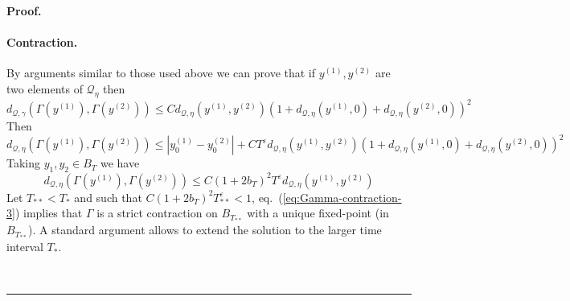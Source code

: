 \documentclass[a4paper,11pt,reqno]{article}
\newcommand{\eps}{\varepsilon}
\newcommand{\QQ}{\mathcal{Q}}
\newenvironment{proof}[1][Proof]{\textbf{#1.} }{\ \rule{0.5em}{0.5em}}
\begin{document}
\begin{proof}
\paragraph{Contraction.}
By arguments similar to those used above we can prove that if $y^{(1)},
y^{(2)}$ are two elements of $\QQ_{\eta}$ then
\begin{equation}
  \label{eq:Gamma-contraction}
  d_{\QQ,\gamma}(\Gamma(y^{(1)}),\Gamma(y^{(2)})) \le C d_{\QQ,\eta}(y^{(1)},y^{(2)}) (1+d_{\QQ,\eta}(y^{(1)},0)+d_{\QQ,\eta}(y^{(2)},0))^2 
\end{equation}
Then 
\begin{equation}
  \label{eq:Gamma-contraction-2}
   d_{\QQ,\eta}(\Gamma(y^{(1)}),\Gamma(y^{(2)})) \le
  |y^{(1)}_0-y^{(2)}_0| 
  + C T^\eps  d_{\QQ,\eta}(y^{(1)},y^{(2)}) (1+ d_{\QQ,\eta}(y^{(1)},0)+ d_{\QQ,\eta}(y^{(2)},0))^2 
\end{equation}
Taking $y_1,y_2 \in B_T$ we have
\begin{equation}
  \label{eq:Gamma-contraction-3}
  d_{\QQ,\eta}(\Gamma(y^{(1)}),\Gamma(y^{(2)})) \le
   C (1+2 b_T)^2 T^\eps d_{\QQ,\eta}(y^{(1)},y^{(2)})
\end{equation}
Let $T_{**} < T_*$ and such that  $C (1+2 b_T)^2 T_{**}^\eps < 1$, eq.~(\ref{eq:Gamma-contraction-3}) implies that
$\Gamma$ is a strict contraction on $B_{T_{**}}$ with a unique fixed-point
(in $B_{T_{**}}$).
A standard argument allows to extend the solution 
to the larger time interval $T_*$.


\end{proof}
\end{document}
